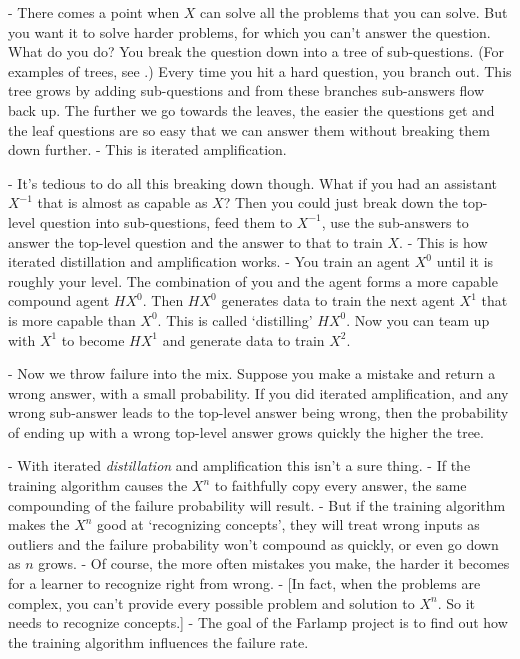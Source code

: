 \documentclass{farlamp}
\begin{document}
- There comes a point when $X$ can solve all the problems that you can solve.
But you want it to solve harder problems, for which you can't answer the
question. What do you do? You break the question down into a tree of
sub-questions. (For examples of trees, see \textcite{StuhFacCog}.) Every time
you hit a hard question, you branch out. This tree grows by adding sub-questions
and from these branches sub-answers flow back up. The further we go towards the
leaves, the easier the questions get and the leaf questions are so easy that we
can answer them without breaking them down further.
- This is iterated amplification.

- It's tedious to do all this breaking down though. What if you had an
assistant $X^{-1}$ that is almost as capable as $X$? Then you could just break down the
top-level question into sub-questions, feed them to $X^{-1}$, use the
sub-answers to answer the top-level question and the answer to that to train
$X$.
- This is how iterated distillation and amplification works.
- You train an agent $X^0$ until it is roughly your level. The combination of
you and the agent forms a more capable compound agent $HX^0$. Then $HX^0$
generates data to train the next agent $X^1$ that is more capable than $X^0$.
This is called ‘distilling’ $HX^0$. Now you can team up with $X^1$ to become
$HX^1$ and generate data to train $X^2$.

- Now we throw failure into the mix. Suppose you make a mistake and return a
wrong answer, with a small probability. If you did iterated amplification, and
any wrong sub-answer leads to the top-level answer being wrong, then the
probability of ending up with a wrong top-level answer grows quickly the higher
the tree.

- With iterated \emph{distillation} and amplification this isn't a sure thing.
- If the training algorithm causes the $X^n$ to faithfully copy every
answer, the same compounding of the failure probability will result.
- But if the training algorithm makes the $X^n$ good at ‘recognizing concepts’,
they will treat wrong inputs as outliers and the failure probability won't
compound as quickly, or even go down as $n$ grows.
- Of course, the more often mistakes you make, the harder it becomes for a
learner to recognize right from wrong.
- [In fact, when the problems are complex, you can't provide every possible
problem and solution to $X^n$. So it needs to recognize concepts.]
- The goal of the Farlamp project is to find out how the training algorithm
influences the failure rate.
\end{document}
